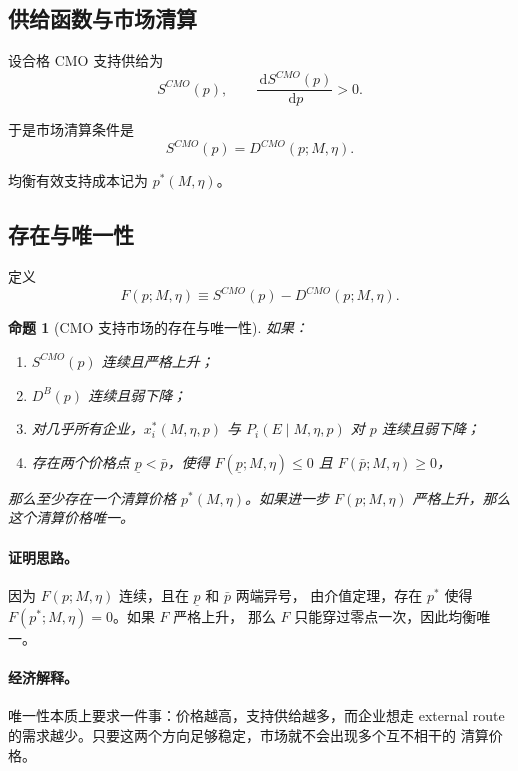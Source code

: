 \documentclass[12pt,UTF8]{ctexart}
\newcommand{\dd}{\,\mathrm{d}}
\theoremstyle{plain}
\newtheorem{proposition}{命题}[section]
\theoremstyle{remark}
\begin{document}
\subsection{供给函数与市场清算}

设合格 CMO 支持供给为
\begin{equation}
S^{CMO}(p),
\qquad
\frac{\dd S^{CMO}(p)}{\dd p}>0.
\label{eq:cmo_supply}
\end{equation}

于是市场清算条件是
\begin{equation}
S^{CMO}(p)=D^{CMO}(p;M,\eta).
\label{eq:market_clearing}
\end{equation}

均衡有效支持成本记为 $p^*(M,\eta)$。

\subsection{存在与唯一性}

定义
\begin{equation}
F(p;M,\eta)
\equiv
S^{CMO}(p)-D^{CMO}(p;M,\eta).
\label{eq:F_function}
\end{equation}

\begin{proposition}[CMO 支持市场的存在与唯一性]
如果：
\begin{enumerate}[label=(\roman*),leftmargin=2em]
    \item $S^{CMO}(p)$ 连续且严格上升；
    \item $D^B(p)$ 连续且弱下降；
    \item 对几乎所有企业，$x_i^*(M,\eta,p)$ 与
    $P_i(E\mid M,\eta,p)$ 对 $p$ 连续且弱下降；
    \item 存在两个价格点 $\underline p<\bar p$，使得
    $F(\underline p;M,\eta)\le 0$ 且 $F(\bar p;M,\eta)\ge 0$，
\end{enumerate}
那么至少存在一个清算价格 $p^*(M,\eta)$。如果进一步
$F(p;M,\eta)$ 严格上升，那么这个清算价格唯一。
\end{proposition}

\paragraph{证明思路。}
因为 $F(p;M,\eta)$ 连续，且在 $\underline p$ 和 $\bar p$ 两端异号，
由介值定理，存在 $p^*$ 使得 $F(p^*;M,\eta)=0$。如果 $F$ 严格上升，
那么 $F$ 只能穿过零点一次，因此均衡唯一。

\paragraph{经济解释。}
唯一性本质上要求一件事：价格越高，支持供给越多，而企业想走 external
route 的需求越少。只要这两个方向足够稳定，市场就不会出现多个互不相干的
清算价格。
\end{document}
